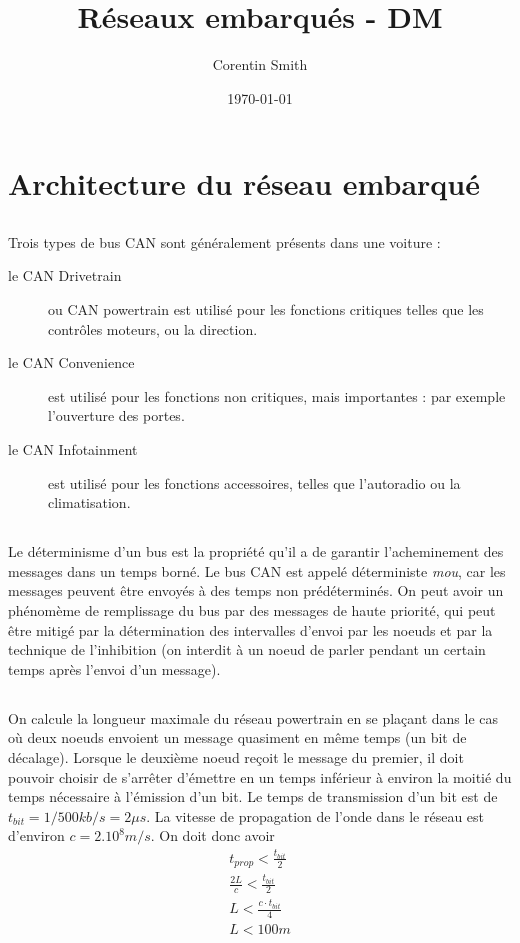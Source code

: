 \documentclass[a4paper]{article}
\title{Réseaux embarqués - DM}
\author{Corentin Smith}
\date{\today}
\begin{document}
\maketitle


\section{Architecture du réseau embarqué}

\subsection{}
Trois types de bus CAN sont généralement présents dans une voiture :
\begin{description}
  \item[le CAN Drivetrain] ou CAN powertrain est utilisé pour les fonctions critiques telles que les contrôles moteurs, ou la direction.
  \item[le CAN Convenience] est utilisé pour les fonctions non critiques, mais importantes : par exemple l'ouverture des portes.
  \item[le CAN Infotainment] est utilisé pour les fonctions accessoires, telles que l'autoradio ou la climatisation.
\end{description}

\subsection{}
Le déterminisme d'un bus est la propriété qu'il a de garantir l'acheminement des messages dans un temps borné. Le bus CAN est appelé déterministe \emph{mou}, car les messages peuvent être envoyés à des temps non prédéterminés. On peut avoir un phénomème de remplissage du bus par des messages de haute priorité, qui peut être mitigé par la détermination des intervalles d'envoi par les noeuds et par la technique de l'inhibition (on interdit à un noeud de parler pendant un certain temps après l'envoi d'un message).

\subsection{}
On calcule la longueur maximale du réseau powertrain en se plaçant dans le cas où deux noeuds envoient un message quasiment en même temps (un bit de décalage).
Lorsque le deuxième noeud reçoit le message du premier, il doit pouvoir choisir de s'arrêter d'émettre en un temps inférieur à environ la moitié du temps nécessaire à l'émission d'un bit.
Le temps de transmission d'un bit est de $t_{bit} = 1/500kb/s = 2\mu s$. La vitesse de propagation de l'onde dans le réseau est d'environ $c = 2.10^{8} m/s$.
On doit donc avoir
\begin{align*}
t_{prop} < \frac{t_{bit}}{2} \\
\frac{2L}{c} < \frac{t_{bit}}{2} \\
L < \frac{c \cdot t_{bit}}{4} \\
L < 100m
\end{align*}
\end{document}

